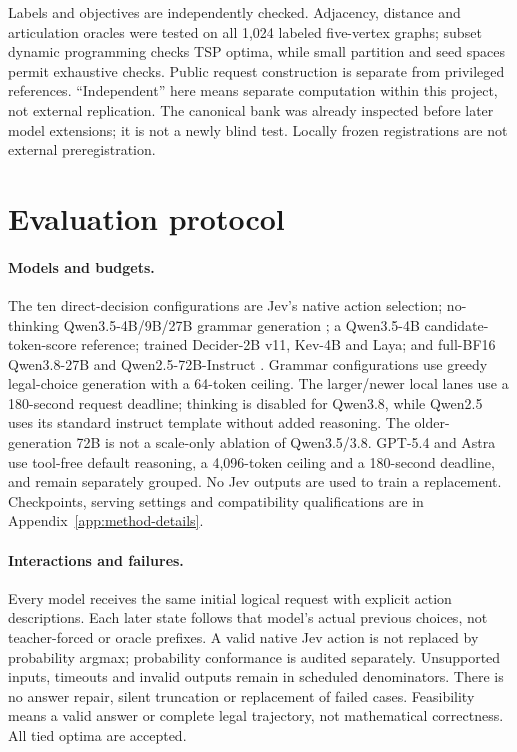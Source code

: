 Labels and objectives are independently checked. Adjacency, distance and
articulation oracles were tested on all 1,024 labeled five-vertex graphs;
subset dynamic programming checks TSP optima, while small partition and seed
spaces permit exhaustive checks. Public request construction is separate
from privileged references. ``Independent'' here means separate computation
within this project, not external replication. The canonical bank was
already inspected before later model extensions; it is not a newly blind
test. Locally frozen registrations are not external preregistration.

\section{Evaluation protocol}
\label{sec:methods}
\paragraph{Models and budgets.}
The ten direct-decision configurations are Jev's native action selection;
no-thinking Qwen3.5-4B/9B/27B grammar generation \cite{qwen2026qwen35}; a Qwen3.5-4B
candidate-token-score reference; trained Decider-2B v11, Kev-4B and Laya;
and full-BF16 Qwen3.8-27B \cite{qwen2026qwen38} and
Qwen2.5-72B-Instruct \cite{qwen2024qwen25}.
Grammar configurations use greedy legal-choice generation with a 64-token
ceiling. The larger/newer local lanes use a 180-second request deadline;
thinking is disabled for Qwen3.8, while Qwen2.5 uses its standard instruct
template without added reasoning. The older-generation 72B is not a scale-only
ablation of Qwen3.5/3.8. GPT-5.4 and Astra use tool-free default reasoning,
a 4,096-token ceiling and a 180-second deadline, and remain separately grouped.
No Jev outputs are used to train a replacement. Checkpoints, serving settings
and compatibility qualifications are in Appendix~\ref{app:method-details}.

\paragraph{Interactions and failures.}
Every model receives the same initial logical request with explicit action
descriptions. Each later state follows that model's actual previous choices,
not teacher-forced or oracle prefixes. A valid native Jev action is not
replaced by probability argmax; probability conformance is audited separately.
Unsupported inputs, timeouts and invalid outputs remain in scheduled
denominators. There is no answer repair, silent truncation or replacement
of failed cases. Feasibility means a valid answer or complete legal trajectory,
not mathematical correctness. All tied optima are accepted.

